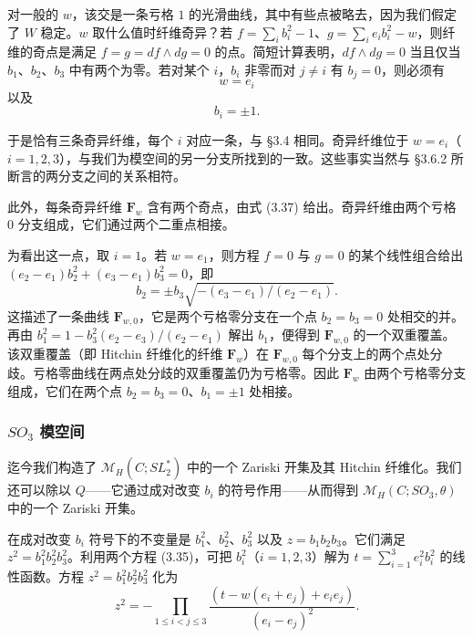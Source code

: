 \documentclass[11pt,a4paper]{article}
\begin{document}
对一般的 $w$，该交是一条亏格 $1$ 的光滑曲线，其中有些点被略去，因为我们假定了 $W$ 稳定。$w$ 取什么值时纤维奇异？若 $f=\sum_ib_i^2-1$、$g=\sum_ie_ib_i^2-w$，则纤维的奇点是满足 $f=g=df\wedge dg=0$ 的点。简短计算表明，$df\wedge dg=0$ 当且仅当 $b_1$、$b_2$、$b_3$ 中有两个为零。若对某个 $i$，$b_i$ 非零而对 $j\ne i$ 有 $b_j=0$，则必须有
\begin{equation}\tag{3.36}
w=e_i
\end{equation}
以及
\begin{equation}\tag{3.37}
b_i=\pm1.
\end{equation}

于是恰有三条奇异纤维，每个 $i$ 对应一条，与 §3.4 相同。奇异纤维位于 $w=e_i$（$i=1,2,3$），与我们为模空间的另一分支所找到的一致。这些事实当然与 §3.6.2 所断言的两分支之间的关系相符。

此外，每条奇异纤维 $\boldsymbol{F}_w$ 含有两个奇点，由式 (3.37) 给出。奇异纤维由两个亏格 $0$ 分支组成，它们通过两个二重点相接。


为看出这一点，取 $i=1$。若 $w=e_1$，则方程 $f=0$ 与 $g=0$ 的某个线性组合给出 $(e_2-e_1)b_2^2+(e_3-e_1)b_3^2=0$，即
\begin{equation}\tag{3.38}
b_2=\pm b_3\sqrt{-(e_3-e_1)/(e_2-e_1)}.
\end{equation}
这描述了一条曲线 $\boldsymbol{F}_{w,0}$，它是两个亏格零分支在一个点 $b_2=b_3=0$ 处相交的并。再由 $b_1^2=1-b_3^2(e_2-e_3)/(e_2-e_1)$ 解出 $b_1$，便得到 $\boldsymbol{F}_{w,0}$ 的一个双重覆盖。该双重覆盖（即 Hitchin 纤维化的纤维 $\boldsymbol{F}_w$）在 $\boldsymbol{F}_{w,0}$ 每个分支上的两个点处分歧。亏格零曲线在两点处分歧的双重覆盖仍为亏格零。因此 $\boldsymbol{F}_w$ 由两个亏格零分支组成，它们在两个点 $b_2=b_3=0$、$b_1=\pm1$ 处相接。

\subsubsection{\texorpdfstring{$SO_3$}{SO3} 模空间}

迄今我们构造了 $\mathcal{M}_H(C;SL_2^*)$ 中的一个 Zariski 开集及其 Hitchin 纤维化。我们还可以除以 $Q$——它通过成对改变 $b_i$ 的符号作用——从而得到 $\mathcal{M}_H(C;SO_3,\theta)$ 中的一个 Zariski 开集。

在成对改变 $b_i$ 符号下的不变量是 $b_1^2$、$b_2^2$、$b_3^2$ 以及 $z=b_1b_2b_3$。它们满足 $z^2=b_1^2b_2^2b_3^2$。利用两个方程 (3.35)，可把 $b_i^2$（$i=1,2,3$）解为 $t=\sum_{i=1}^3e_i^2b_i^2$ 的线性函数。方程 $z^2=b_1^2b_2^2b_3^2$ 化为
\begin{equation}\tag{3.39}
z^2=-\prod_{1\le i<j\le3}\frac{(t-w(e_i+e_j)+e_ie_j)}{(e_i-e_j)^2}.
\end{equation}
\end{document}

